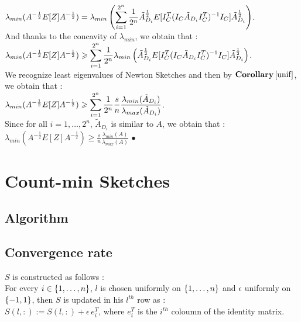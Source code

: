 $\lambda_{min}(A^{-\frac12}E[Z]A^{-\frac12}) = \lambda_{min}\left( \displaystyle\sum\limits_{i=1}^{2^{n}} \frac{1}{ 2^{n}} \tilde{A}_{D_{i}}^{\frac 12} E[ I_{C}^{T} (I_{C} \tilde{A}_{D_{i}} I_{C}^{T})^{-1} I_{C} ] \tilde{A}_{D_{i}}^{\frac 12} \right)$.\\
And thanks to the concavity of $\lambda_{min}$, we obtain that :\\
$\lambda_{min}(A^{-\frac12}E[Z]A^{-\frac12}) \geqslant  \displaystyle\sum\limits_{i=1}^{2^{n}} \frac{1}{ 2^{n}} \lambda_{min}\left( \tilde{A}_{D_{i}}^{\frac 12} E[ I_{C}^{T} (I_{C} \tilde{A}_{D_{i}} I_{C}^{T})^{-1} I_{C} ] \tilde{A}_{D_{i}}^{\frac 12}\right)$.\\

We recognize least eigenvalues of Newton Sketches and then by $\textbf{Corollary}\, \ref{unif}$, we obtain that :\\

$\lambda_{min}(A^{-\frac12}E[Z]A^{-\frac12}) \geqslant  \displaystyle\sum\limits_{i=1}^{2^{n}} \frac{1}{ 2^{n}} \frac{s}{n} \frac{\lambda_{min}(\tilde{A}_{D_{i}})}{\lambda_{max}(\tilde{A}_{D_{i}})}$.\\
Since for all $i = 1,\dots, 2^{n}$, $\tilde{A}_{D_{i}}$ is similar to $A$, we obtain that :\\

$\lambda_{min}(A^{-\frac12}E[Z]A^{-\frac12}) \geq \frac{s}{n} \frac{\lambda_{min}(A)}{\lambda_{max}(A)}$ $\bullet$




\chapter{Count-min Sketches}

%
%
%

\section{Algorithm}


\section{Convergence rate}

$S$ is constructed as follows :\\
For every $i\in\left\{1,\dots,n\right\}$, $l$ is chosen uniformly on $\left\{1,\dots,n\right\}$ and $\epsilon$ uniformly on $\left\{-1,1\right\}$, then $S$ is updated in his $l^{th}$ row as :\\
$S(l, :) := S(l,:) + \epsilon \, e_{i}^{T}$, where $e_{i}^{T}$ is the $i^{th}$ coloumn of the identity matrix.\\\\



